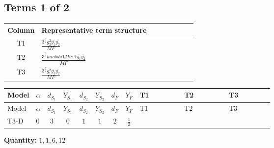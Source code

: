 \documentclass[8pt]{article}
\begin{document}
\begin{landscape}
\subsection*{Terms 1 of 2}
\begin{center}
\begin{tabular}{@{}c >{\raggedright\arraybackslash}p{0.82\linewidth}@{}}
\toprule
Column & Representative term structure \\
\midrule
T1 & \(\displaystyle \frac{3^{\frac{3}{4}} g_{2}^{2} \overline{y_{1}} \overline{y_{2}}}{MF}\) \\
\midrule
T2 & \(\displaystyle \frac{3^{\frac{3}{4}} lambda12Inv1 \overline{y_{1}} \overline{y_{2}}}{MF}\) \\
\midrule
T3 & \(\displaystyle \frac{3^{\frac{3}{4}} g_{1}^{2} \overline{y_{1}} \overline{y_{2}}}{MF}\) \\
\midrule
\bottomrule
\end{tabular}
\end{center}
\smallskip
\tiny
\begin{longtable}{@{}llcccccc >{\raggedright\arraybackslash}p{0.21\linewidth} >{\raggedright\arraybackslash}p{0.21\linewidth} >{\raggedright\arraybackslash}p{0.21\linewidth}@{}}
\toprule
Model & $\alpha$ & $d_{S_1}$ & $Y_{S_1}$ & $d_{S_2}$ & $Y_{S_2}$ & $d_F$ & $Y_F$ & T1 & T2 & T3 \\
\midrule
\endfirsthead
\toprule
Model & $\alpha$ & $d_{S_1}$ & $Y_{S_1}$ & $d_{S_2}$ & $Y_{S_2}$ & $d_F$ & $Y_F$ & T1 & T2 & T3 \\
\midrule
\endhead
T3-D & $0$ & $3$ & $0$ & $1$ & $1$ & $2$ & $\frac{1}{2}$ & \scriptsize\adjustbox{max width=\linewidth}{$\begin{gathered} - \frac{17 \cdot 3^{\frac{3}{4}} g_{2}^{2} \overline{y_{1}} \overline{y_{2}}}{24 MF}\end{gathered}$} & \scriptsize\adjustbox{max width=\linewidth}{$\begin{gathered} - \frac{3^{\frac{3}{4}} lambda12Inv1 \overline{y_{1}} \overline{y_{2}}}{6 MF}\end{gathered}$} & \scriptsize\adjustbox{max width=\linewidth}{$\begin{gathered} - \frac{3^{\frac{3}{4}} g_{1}^{2} \overline{y_{1}} \overline{y_{2}}}{8 MF}\end{gathered}$} \\
\midrule
\bottomrule
\end{longtable}
\clearpage
\noindent\textbf{Quantity: }$\mathrm{1,1,6,12}$\par\smallskip

\end{landscape}
\end{document}
